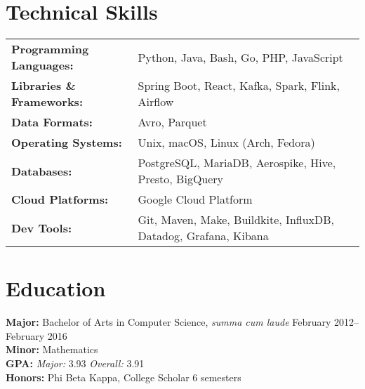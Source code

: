 \documentclass[10pt]{resume}
\begin{document}
\section{Technical Skills}

\begin{tabular}{>{\bfseries}l l}
Programming Languages:  &  Python, Java, Bash, Go, PHP, JavaScript                         \\
Libraries \& Frameworks:&  Spring Boot, React, Kafka, Spark, Flink, Airflow                \\
Data Formats:           &  Avro, Parquet                                                   \\
Operating Systems:      &  Unix, macOS, Linux (Arch, Fedora)                               \\
Databases:              &  PostgreSQL, MariaDB, Aerospike, Hive, Presto, BigQuery          \\
Cloud Platforms:        &  Google Cloud Platform                                           \\
Dev Tools:              &  Git, Maven, Make, Buildkite, InfluxDB, Datadog, Grafana, Kibana \\
\end{tabular}

\section{Education}

\textbf{Major:} Bachelor of Arts in Computer Science, \textit{summa cum laude} \hfill February 2012--February 2016\\
\textbf{Minor:} Mathematics\\
\textbf{GPA:} \textit{Major:} 3.93 \textit{Overall:} 3.91\\
\textbf{Honors:} Phi Beta Kappa, College Scholar 6 semesters
\end{document}
